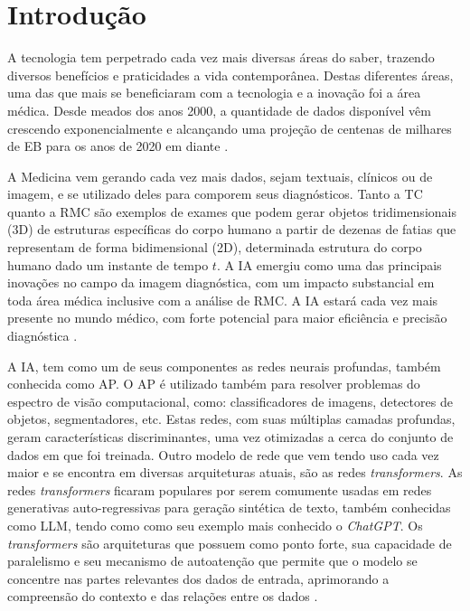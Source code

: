\chapter{Introdução}
\label{chap:intro}

A tecnologia tem perpetrado cada vez mais diversas áreas do saber, trazendo diversos benefícios e praticidades a vida contemporânea. Destas diferentes áreas, uma das que mais se beneficiaram com a tecnologia e a inovação foi a área médica. Desde meados dos anos 2000, a quantidade de dados disponível vêm crescendo exponencialmente e alcançando uma projeção de centenas de milhares de \gls{EB} para os anos de 2020 em diante \cite{gantzDIGITALUNIVERSE2020}.

A Medicina vem gerando cada vez mais dados, sejam textuais, clínicos ou de imagem, e se utilizado deles para comporem seus diagnósticos. Tanto a \gls{TC} quanto a \gls{RMC} são exemplos de exames que podem gerar objetos tridimensionais (3D) de estruturas específicas do corpo humano a partir de dezenas de fatias que representam de forma bidimensional (2D), determinada estrutura do corpo humano dado um instante de tempo $t$. A \gls{IA} emergiu como uma das principais inovações no campo da imagem diagnóstica, com um impacto substancial em toda área médica inclusive com a análise de \gls{RMC}. A \gls{IA} estará cada vez mais presente no mundo médico, com forte potencial para maior eficiência e precisão diagnóstica \cite{argentieroApplicationsArtificialIntelligence2022}.

A IA, tem como um de seus componentes as redes neurais profundas, também conhecida como \gls{AP}. O \gls{AP} é utilizado também para resolver problemas do espectro de visão computacional, como: classificadores de imagens, detectores de objetos, segmentadores, etc. Estas redes, com suas múltiplas camadas profundas, geram características discriminantes, uma vez otimizadas a cerca do conjunto de dados em que foi treinada. Outro modelo de rede que vem tendo uso cada vez maior e se encontra em diversas arquiteturas atuais, são as redes \textit{transformers}. As redes \textit{transformers} ficaram populares por serem comumente usadas em redes generativas auto-regressivas para geração sintética de texto, também conhecidas como \gls{LLM}, tendo como como seu exemplo mais conhecido o \textit{ChatGPT}. Os \textit{transformers} são arquiteturas que possuem como ponto forte, sua capacidade de paralelismo e seu mecanismo de autoatenção que permite que o modelo se concentre nas partes relevantes dos dados de entrada, aprimorando a compreensão do contexto e das relações entre os dados \cite{russell2020artificial}.


